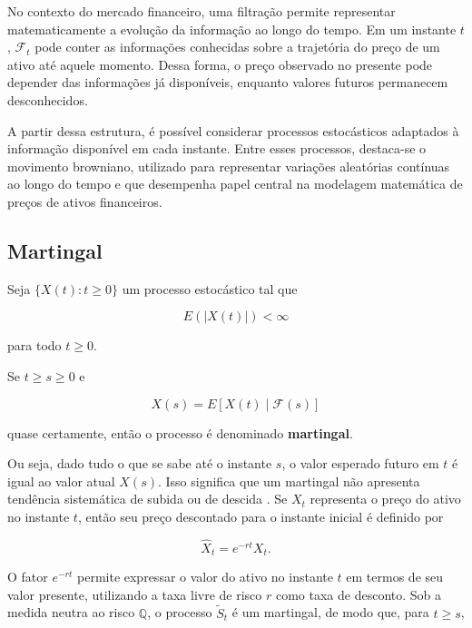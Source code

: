 No contexto do mercado financeiro, uma filtração permite representar
matematicamente a evolução da informação ao longo do tempo. Em um
instante $t$, $\mathcal{F}_t$ pode conter as informações conhecidas
sobre a trajetória do preço de um ativo até aquele momento. Dessa forma,
o preço observado no presente pode depender das informações já
disponíveis, enquanto valores futuros permanecem desconhecidos.

A partir dessa estrutura, é possível considerar processos estocásticos adaptados à informação disponível em cada instante.
Entre esses processos, destaca-se o movimento browniano, utilizado para representar variações aleatórias contínuas ao longo do tempo e que desempenha papel central na modelagem matemática de preços de ativos financeiros.

\subsection{Martingal}

Seja $\{X(t): t \geq 0\}$ um processo estocástico tal que

\begin{equation}
E\left(|X(t)|\right) < \infty
\end{equation}

para todo $t \geq 0$.

Se $t \geq s \geq 0$ e

\begin{equation}
X(s) = E\left[X(t)\mid\mathcal{F}(s)\right]
\end{equation}

quase certamente, então o processo é denominado \textbf{martingal}.

Ou seja, dado tudo o que se sabe até o instante $s$, o valor esperado
futuro em $t$ é igual ao valor atual $X(s)$. Isso significa que um
martingal não apresenta tendência sistemática de subida ou de descida \cite{albani2025}. Se $X_t$ representa o preço do ativo no instante $t$, então seu preço
descontado para o instante inicial é definido por

\begin{equation}
\widehat{X}_t = e^{-rt}X_t.
\end{equation}

O fator $e^{-rt}$ permite expressar o valor do ativo no instante $t$ em
termos de seu valor presente, utilizando a taxa livre de risco $r$ como
taxa de desconto. Sob a medida neutra ao risco $\mathbb{Q}$, o processo
$\widetilde{S}_t$ é um martingal, de modo que, para $t \geq s$,

